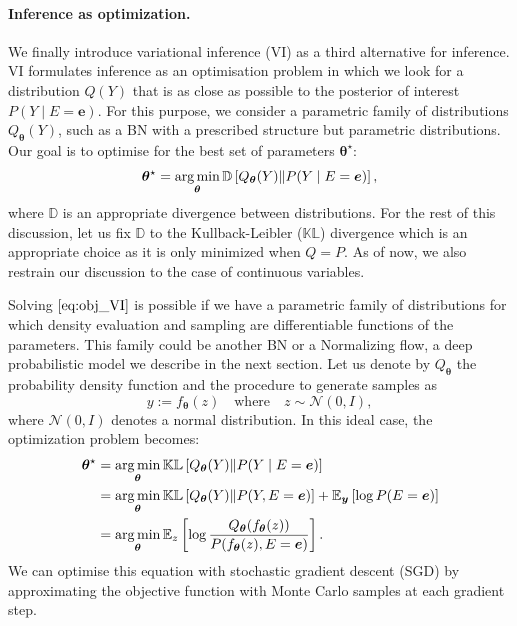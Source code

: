 \paragraph{Inference as optimization.}
We finally introduce variational inference (VI) as a third alternative for inference. VI formulates inference as an optimisation problem in which we look for a distribution $Q(Y)$ that is as close as possible to the posterior of interest $P(Y\mid E=\bm{e})$. For this purpose, we consider a parametric family of distributions $Q_{\bm{\theta}}(Y)$, such as a BN with a prescribed structure but parametric distributions. Our goal is to optimise for the best set of parameters $\bm{\theta}^\star$:
\begin{align}
  \bm{\theta}^\star = \operatorname*{arg\,min}_{\bm{\theta}} \mathbb{D}\left[Q_{\bm{\theta}}(Y)\Vert P(Y\mid E=\bm{e}) \right], \label{eq:obj_VI}
\end{align}
where $\mathbb{D}$ is an appropriate divergence between distributions. For the rest of this discussion, let us fix $\mathbb{D}$ to the Kullback-Leibler ($\mathbb{KL}$) divergence which is an appropriate choice as it is only minimized when $Q = P$. As of now, we also restrain our discussion to the case of continuous variables.

Solving $\Cref{eq:obj_VI}$ is possible if we have a parametric family of distributions for which density evaluation and sampling are differentiable functions of the parameters. This family could be another BN or a Normalizing flow, a deep probabilistic model we describe in the next section. Let us denote by $Q_{\bm{\theta}}$ the probability density function and the procedure to generate samples as $$ y := f_{\bm{\theta}}(z) \quad\text{where}\quad z\sim \mathcal{N}(0, I),$$
where $\mathcal{N}(0, I)$ denotes a normal distribution.
In this ideal case, the optimization problem becomes:
\begin{align}
  \bm{\theta}^\star &= \operatorname*{arg\,min}_{\bm{\theta}} \mathbb{KL}\left[Q_{\bm{\theta}}(Y)\Vert P(Y\mid E=\bm{e}) \right]\\ \label{eq:VI_optim}
  &= \operatorname*{arg\,min}_{\bm{\theta}} \mathbb{KL}\left[Q_{\bm{\theta}}(Y)\Vert P(Y, E=\bm{e}) \right] + \mathbb{E}_{\bm y}\left[\log P(E=\bm{e})\right]\\
  &= \operatorname*{arg\,min}_{\bm{\theta}} \mathbb{E}_{z}\left[ \log \frac{Q_{\bm{\theta}}(f_{\bm{\theta}}(z))}{P(f_{\bm{\theta}}(z), E=\bm{e})} \right].
\end{align}
We can optimise this equation with stochastic gradient descent (SGD) by approximating the objective function with Monte Carlo samples at each gradient step.

